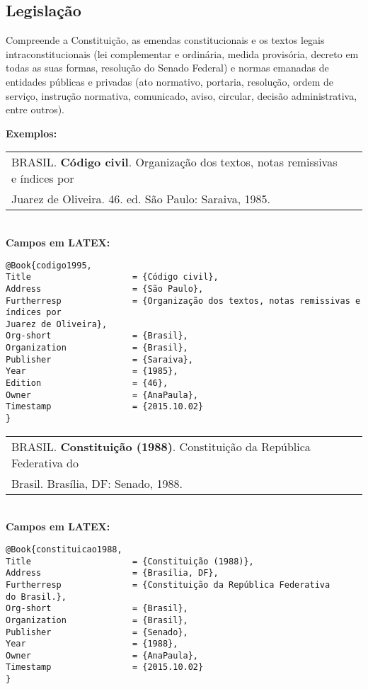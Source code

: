 \subsection{Legislação}

Compreende a Constituição, as emendas constitucionais e os textos
legais intraconstitucionais (lei complementar e ordinária, medida
provisória, decreto em todas as suas formas, resolução do Senado
Federal) e normas emanadas de entidades públicas e privadas (ato
normativo, portaria, resolução, ordem de serviço, instrução normativa,
comunicado, aviso, circular, decisão administrativa, entre outros). 

\textbf{Exemplos:} \\

\begin{tabular}{|l|c|} \hline
BRASIL. \textbf{Código civil}. Organização dos textos, notas remissivas e índices por \\Juarez de Oliveira. 46. ed. São Paulo: Saraiva, 1985. 
	\\\hline
\end{tabular} \\

\textbf{Campos em LATEX:} 
\begin{verbatim}
@Book{codigo1995,
Title                    = {Código civil},
Address                  = {São Paulo},
Furtherresp              = {Organização dos textos, notas remissivas e 
índices por 
Juarez de Oliveira},
Org-short                = {Brasil},
Organization             = {Brasil},
Publisher                = {Saraiva},
Year                     = {1985},
Edition                  = {46},
Owner                    = {AnaPaula},
Timestamp                = {2015.10.02}
}

\end{verbatim}

\begin{tabular}{|l|c|} \hline
BRASIL. \textbf{Constituição (1988)}. Constituição da República Federativa do \\Brasil. Brasília, DF: Senado, 1988. 
	\\\hline
\end{tabular} \\

\textbf{Campos em LATEX:} 

\begin{verbatim}
@Book{constituicao1988,
Title                    = {Constituição (1988)},
Address                  = {Brasília, DF},
Furtherresp              = {Constituição da República Federativa 
do Brasil.},
Org-short                = {Brasil},
Organization             = {Brasil},
Publisher                = {Senado},
Year                     = {1988},
Owner                    = {AnaPaula},
Timestamp                = {2015.10.02}
}
\end{verbatim}

